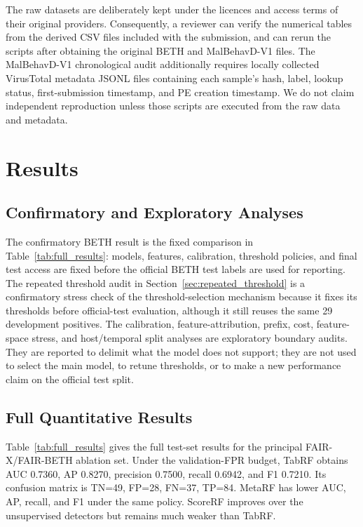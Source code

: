 \documentclass[10pt,journal,compsoc]{IEEEtran}
\begin{document}
The raw datasets are deliberately kept under the licences and access terms of their original providers. Consequently, a reviewer can verify the numerical tables from the derived CSV files included with the submission, and can rerun the scripts after obtaining the original BETH and MalBehavD-V1 files. The MalBehavD-V1 chronological audit additionally requires locally collected VirusTotal metadata JSONL files containing each sample's hash, label, lookup status, first-submission timestamp, and PE creation timestamp. We do not claim independent reproduction unless those scripts are executed from the raw data and metadata.

\section{Results}
\label{sec:results}

\subsection{Confirmatory and Exploratory Analyses}

The confirmatory BETH result is the fixed comparison in Table~\ref{tab:full_results}: models, features, calibration, threshold policies, and final test access are fixed before the official BETH test labels are used for reporting. The repeated threshold audit in Section~\ref{sec:repeated_threshold} is a confirmatory stress check of the threshold-selection mechanism because it fixes its thresholds before official-test evaluation, although it still reuses the same 29 development positives. The calibration, feature-attribution, prefix, cost, feature-space stress, and host/temporal split analyses are exploratory boundary audits. They are reported to delimit what the model does not support; they are not used to select the main model, to retune thresholds, or to make a new performance claim on the official test split.

\subsection{Full Quantitative Results}

Table~\ref{tab:full_results} gives the full test-set results for the principal FAIR-X/FAIR-BETH ablation set. Under the validation-FPR budget, TabRF obtains AUC 0.7360, AP 0.8270, precision 0.7500, recall 0.6942, and F1 0.7210. Its confusion matrix is TN=49, FP=28, FN=37, TP=84. MetaRF has lower AUC, AP, recall, and F1 under the same policy. ScoreRF improves over the unsupervised detectors but remains much weaker than TabRF.
\end{document}

